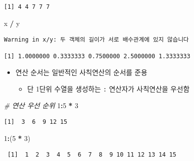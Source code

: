 \documentclass[
  11pt,
]{krantz}
\newenvironment{Shaded}{\begin{snugshade}}{\end{snugshade}}
\newcommand{\CommentTok}[1]{\textcolor[rgb]{0.37,0.37,0.37}{\textit{#1}}}
\newcommand{\DecValTok}[1]{\textcolor[rgb]{0.06,0.06,0.06}{#1}}
\newcommand{\NormalTok}[1]{#1}
\newcommand{\OperatorTok}[1]{\textcolor[rgb]{0.43,0.43,0.43}{\textbf{#1}}}
\newcommand{\StringTok}[1]{\textcolor[rgb]{0.5,0.5,0.5}{#1}}
\providecommand{\tightlist}{%
  \setlength{\itemsep}{0pt}\setlength{\parskip}{0pt}}
\begin{document}
\begin{verbatim}
[1] 4 4 7 7 7
\end{verbatim}

\begin{Shaded}
\begin{Highlighting}[]
\NormalTok{x }\OperatorTok{/}\StringTok{ }\NormalTok{y}
\end{Highlighting}
\end{Shaded}

\begin{verbatim}
Warning in x/y: 두 객체의 길이가 서로 배수관계에 있지 않습니다
\end{verbatim}

\begin{verbatim}
[1] 1.0000000 0.3333333 0.7500000 2.5000000 1.3333333
\end{verbatim}

\normalsize

\begin{itemize}
\tightlist
\item
  연산 순서는 일반적인 사칙연산의 순서를 준용

  \begin{itemize}
  \tightlist
  \item
    단 1단위 수열을 생성하는 \texttt{:} 연산자가 사칙연산을 우선함
  \end{itemize}
\end{itemize}

\footnotesize

\begin{Shaded}
\begin{Highlighting}[]
\CommentTok{# 연산 우선 순위}
\DecValTok{1}\OperatorTok{:}\DecValTok{5} \OperatorTok{*}\StringTok{ }\DecValTok{3}
\end{Highlighting}
\end{Shaded}

\begin{verbatim}
[1]  3  6  9 12 15
\end{verbatim}

\begin{Shaded}
\begin{Highlighting}[]
\DecValTok{1}\OperatorTok{:}\NormalTok{(}\DecValTok{5} \OperatorTok{*}\StringTok{ }\DecValTok{3}\NormalTok{)}
\end{Highlighting}
\end{Shaded}

\begin{verbatim}
 [1]  1  2  3  4  5  6  7  8  9 10 11 12 13 14 15
\end{verbatim}
\end{document}
